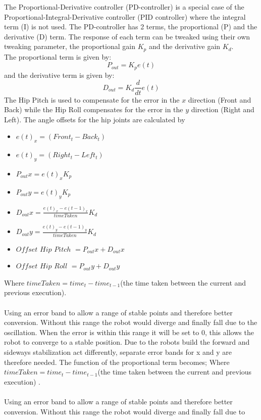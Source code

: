 \documentclass[a4paper]{article}
\begin{document}
The Proportional-Derivative controller (PD-controller) is a special case of the
Proportional-Integral-Derivative controller (PID controller) where the integral
term (I) is not used.  The PD-controller has 2 terms, the proportional (P) and
the derivative (D) term. The response of each term can be tweaked using their own tweaking parameter, the proportional gain $K_p$ and the derivative gain $K_d$. \\
The proportional term is given by:
\[
P_{out}  = K_pe(t)
 \]
and the derivative term is given by:
\[
D_{out}  = K_d\frac{d}{dt}e(t)
\]
The Hip Pitch is used to compensate for the error in the $x$ direction (Front
and Back) while the Hip Roll compensates for the error in the $y$ direction (Right and Left).
The angle offsets for the hip joints are calculated by
\begin{itemize}
    \item $e(t)_x = (Front_t - Back_t)$
    \item $e(t)_y = (Right_t - Left_t)$
    \item $P_{out} x = e(t)_xK_p$
    \item $P_{out} y = e(t)_yK_p$
    \item $D_{out} x = \frac{e(t)_x - e(t-1)_x}{timeTaken}K_d$
    \item $D_{out} y = \frac{e(t)_y - e(t-1)_y}{timeTaken}K_d$
    \item  $Offset$ $Hip$ $Pitch$ $= P_{out}x + D_{out}x$ 
    \item $Offset$ $Hip$ $Roll$ $=  P_{out}y + D_{out}y$ 
\end{itemize}
Where $timeTaken = time_t - time_{t-1}$(the time taken between the current and previous execution).\\\\
Using an error band to allow a range of stable points and therefore better conversion. Without this range the robot would diverge and finally fall due to the oscillation. When the error is within this range it will be set to 0, this allows the robot to converge to a stable position. Due to the robots build the forward and sideways stabilization act differently, separate error bands for x and y are therefore needed. The function of the proportional term becomes;
Where $timeTaken = time_t - time_{t-1}$(the time taken between the current and previous execution) .\\\\
Using an error band to allow a range of stable points and therefore better
conversion. Without this range the robot would diverge and finally fall due to
\end{document}
